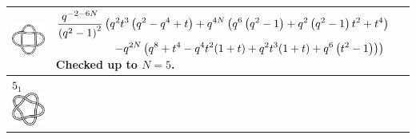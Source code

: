 \documentclass{compositio}
\theoremstyle{definition}
\numberwithin{equation}{section}
\begin{document}
{\begin{longtable}{p{}|p{}}
\includegraphics[scale=0.07,angle=0]{link4_1_2.pdf} 
&
\newline 
$
\displaystyle{%
\frac{q^{-2-6 N}}{\left(q^2-1\right)^2}} \left(q^2 t^3 \left(q^2-q^4+t\right)+q^{4 N} \left(q^6 \left(q^2-1\right)+q^2 \left(q^2-1\right) t^2+t^4\right) \right.
$
\newline
$
\displaystyle{%
\left. \qquad\qquad\quad -q^{2 N} \left(q^8+t^4-q^4 t^2 (1+t)+q^2 t^3 (1+t)+q^6 \left(t^2-1\right)\right)\right)
}
$
\newline
Checked up to $N=5$.
\\
\hline
$5_{1}$ 
\includegraphics[scale=0.07,angle=0]{knot5_1.pdf} 

\end{longtable}}
\end{document}
